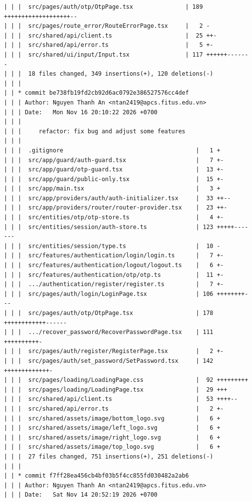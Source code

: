 \documentclass[12pt]{article}
\begin{document}
\begin{lstlisting}[numbers=none,breaklines=true]
| | |  src/pages/auth/otp/OtpPage.tsx               | 189 +++++++++++++++++++--
| | |  src/pages/route_error/RouteErrorPage.tsx     |   2 -
| | |  src/shared/api/client.ts                     |  25 ++-
| | |  src/shared/api/error.ts                      |   5 +-
| | |  src/shared/ui/input/Input.tsx                | 117 ++++++-------
| | |  18 files changed, 349 insertions(+), 120 deletions(-)
| | |
| | * commit be738fb19fd2cb92d6ac0792e386527576cc4def
| | | Author: Nguyen Thanh An <ntan2419@apcs.fitus.edu.vn>
| | | Date:   Mon Nov 16 20:10:22 2026 +0700
| | |
| | |     refactor: fix bug and adjust some features
| | |
| | |  .gitignore                                      |   1 +
| | |  src/app/guard/auth-guard.tsx                    |   7 +-
| | |  src/app/guard/otp-guard.tsx                     |  13 +-
| | |  src/app/guard/public-only.tsx                   |  15 +-
| | |  src/app/main.tsx                                |   3 +
| | |  src/app/providers/auth/auth-initializer.tsx     |  33 ++--
| | |  src/app/providers/router/router-provider.tsx    |  23 ++-
| | |  src/entities/otp/otp-store.ts                   |   4 +-
| | |  src/entities/session/auth-store.ts              | 123 +++++-------
| | |  src/entities/session/type.ts                    |  10 -
| | |  src/features/authentication/login/login.ts      |   7 +-
| | |  src/features/authentication/logout/logout.ts    |   6 +-
| | |  src/features/authentication/otp/otp.ts          |  11 +-
| | |  .../authentication/register/register.ts         |   7 +-
| | |  src/pages/auth/login/LoginPage.tsx              | 106 ++++++++---
| | |  src/pages/auth/otp/OtpPage.tsx                  | 178 ++++++++++++------
| | |  .../recover_password/RecoverPasswordPage.tsx    | 111 ++++++++++-
| | |  src/pages/auth/register/RegisterPage.tsx        |   2 +-
| | |  src/pages/auth/set_password/SetPassword.tsx     | 142 +++++++++++++-
| | |  src/pages/loading/LoadingPage.css               |  92 +++++++++
| | |  src/pages/loading/LoadingPage.tsx               |  29 +++
| | |  src/shared/api/client.ts                        |  53 ++++--
| | |  src/shared/api/error.ts                         |   2 +-
| | |  src/shared/assets/image/bottom_logo.svg         |   6 +
| | |  src/shared/assets/image/left_logo.svg           |   6 +
| | |  src/shared/assets/image/right_logo.svg          |   6 +
| | |  src/shared/assets/image/top_logo.svg            |   6 +
| | |  27 files changed, 751 insertions(+), 251 deletions(-)
| | |
| | * commit f7ff28ea456cb4bf03b5f4cc855fd030482a2ab6
| | | Author: Nguyen Thanh An <ntan2419@apcs.fitus.edu.vn>
| | | Date:   Sat Nov 14 20:52:19 2026 +0700

\end{lstlisting}
\end{document}
